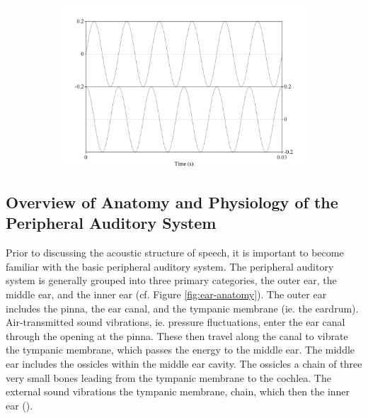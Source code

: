 \begin{figure}[H]
\begin{center}
\begin{subfigure}{0.5\textwidth}
  \includegraphics[width=\textwidth]{figure/basic-sound-phase.png}
  \caption{}
  \label{fig:basic-sound-phase}
\end{subfigure}
\end{center}
\caption{}
\label{fig:basic-sound-wave}
\end{figure}


\DIFaddend \subsection{Overview of Anatomy and Physiology of the Peripheral Auditory System}

Prior to discussing the acoustic structure of speech, it is important to become familiar with the basic peripheral auditory system.  The peripheral auditory system is generally grouped into three primary categories, the outer ear, the middle ear, and the inner ear (cf. Figure \ref{fig:ear-anatomy}).  The outer ear includes the pinna, the ear canal\DIFdelbegin {}\DIFdelend , and the tympanic membrane (ie. the eardrum).  Air-transmitted sound vibrations, ie. pressure fluctuations, enter the ear canal through the opening at the pinna.  These then travel along the canal to vibrate the tympanic membrane, which passes the energy to the middle ear.  The middle ear includes the ossicles within the middle ear cavity.  The ossicles \DIFdelbegin {}\DIFdelend \DIFaddbegin {}\DIFaddend a chain of three very small bones leading from the tympanic membrane to the cochlea. The external sound vibrations \DIFdelbegin {}\DIFdelend \DIFaddbegin {}\DIFaddend the tympanic membrane, \DIFdelbegin {}\DIFdelend \DIFaddbegin {}\DIFaddend chain, which then \DIFdelbegin {}\DIFdelend \DIFaddbegin {}\DIFaddend the inner ear (\cite{rosen:91}).

